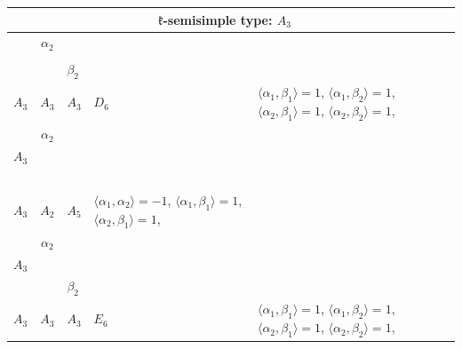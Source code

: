 \documentclass[12pt]{report}
\begin{document}
\begin{appendix}
{\begin{longtable}{rcl p{1cm}p{1cm}p{3cm} }
\\
\hline\multicolumn{5}{c}{$\mathfrak{k}$-semisimple type: $A_3$}\\
\hline\hline\begin{tabular}{cc}$\alpha_1$+ & $\alpha_2$\\\tiny{  } & \tiny{  }\end{tabular} &\begin{tabular}{c} = \\~ \end{tabular} & \begin{tabular}{cc}$\beta_1$+ & $\beta_2$\\\tiny{ $A_3$ } & \tiny{ $A_3$ }\end{tabular} & $A_3$ & $D_6$ &  $\langle\alpha_1, \beta_1\rangle=1$, $\langle\alpha_1, \beta_2\rangle=1$, $\langle\alpha_2, \beta_1\rangle=1$, $\langle\alpha_2, \beta_2\rangle=1$, 
\\
\begin{tabular}{cc}$\alpha_1$+ & $\alpha_2$\\\tiny{ $A_3$ } & \tiny{  }\end{tabular} &\begin{tabular}{c} = \\~ \end{tabular} & \begin{tabular}{c}$\beta_1$\\\tiny{ $A_3$ }\end{tabular} & $A_2$ & $A_5$ & $\langle\alpha_1, \alpha_2\rangle=-1$,  $\langle\alpha_1, \beta_1\rangle=1$, $\langle\alpha_2, \beta_1\rangle=1$, 
\\
\begin{tabular}{cc}$\alpha_1$+ & $\alpha_2$\\\tiny{ $A_3$ } & \tiny{  }\end{tabular} &\begin{tabular}{c} = \\~ \end{tabular} & \begin{tabular}{cc}$\beta_1$+ & $\beta_2$\\\tiny{ $A_3$ } & \tiny{ $A_3$ }\end{tabular} & $A_3$ & $E_6$ &  $\langle\alpha_1, \beta_1\rangle=1$, $\langle\alpha_1, \beta_2\rangle=1$, $\langle\alpha_2, \beta_1\rangle=1$, $\langle\alpha_2, \beta_2\rangle=1$, 
\\

\end{longtable}}
\end{appendix}
\end{document}
